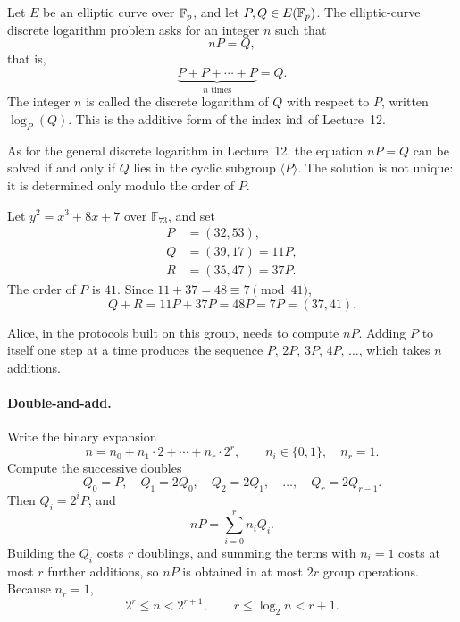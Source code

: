 \begin{keybox}
\begin{definition}[EC-DLP]
Let $E$ be an elliptic curve over $\mathbb F_p$, and let $P,Q\in E(\mathbb F_p)$. The elliptic-curve discrete logarithm problem asks for an integer $n$ such that
\[
    nP=Q,
\]
that is,
\[
    \underbrace{P+P+\cdots+P}_{n\text{ times}}=Q.
\]
The integer $n$ is called the discrete logarithm of $Q$ with respect to $P$, written $\log_P(Q)$. This is the additive form of the index $\operatorname{ind}$ of Lecture~12.
\end{definition}
\end{keybox}

\begin{remark}
As for the general discrete logarithm in Lecture~12, the equation $nP=Q$ can be solved if and only if $Q$ lies in the cyclic subgroup $\langle P\rangle$.
The solution is not unique: it is determined only modulo the order of $P$.
\end{remark}

\begin{example}
Let $y^2=x^3+8x+7$ over $\mathbb{F}_{73}$, and set
\begin{align*}
    P&=(32,53),\\
    Q&=(39,17)=11P,\\
    R&=(35,47)=37P.
\end{align*}
The order of $P$ is $41$. Since $11+37=48\equiv 7\pmod{41}$,
\[
    Q+R=11P+37P=48P=7P=(37,41).
\]
\end{example}

Alice, in the protocols built on this group, needs to compute $nP$. Adding $P$ to itself one step at a time produces the sequence $P,\,2P,\,3P,\,4P,\,\ldots$, which takes $n$ additions.


\paragraph{Double-and-add.}
Write the binary expansion
\[
    n=n_0+n_1\cdot 2+\cdots+n_r\cdot 2^r,
    \qquad
    n_i\in\{0,1\},
    \quad n_r=1.
\]
Compute the successive doubles
\[
    Q_0=P,
    \quad
    Q_1=2Q_0,
    \quad
    Q_2=2Q_1,
    \quad
    \ldots,
    \quad
    Q_r=2Q_{r-1}.
\]
Then $Q_i=2^i P$, and
\[
    nP=\sum_{i=0}^{r} n_i Q_i.
\]
Building the $Q_i$ costs $r$ doublings, and summing the terms with $n_i=1$ costs at most $r$ further additions, so $nP$ is obtained in at most $2r$ group operations. Because $n_r=1$,
\[
    2^r\leq n<2^{r+1},
    \qquad
    r\leq \log_2 n<r+1.
\]


